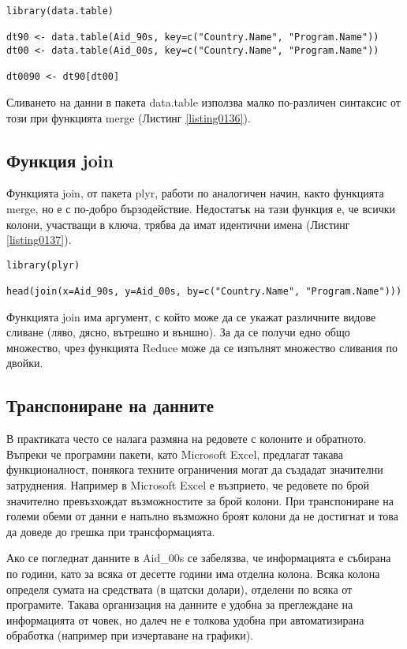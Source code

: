 \begin{lstlisting}[caption=Сливане на данни при data.table, label=listing0136]
library(data.table)

dt90 <- data.table(Aid_90s, key=c("Country.Name", "Program.Name"))
dt00 <- data.table(Aid_00s, key=c("Country.Name", "Program.Name"))

dt0090 <- dt90[dt00]
\end{lstlisting}

Сливането на данни в пакета data.table използва малко по-различен синтаксис от този при функцията merge (Листинг \ref{listing0136}).

\subsection{Функция join}

Функцията join, от пакета plyr, работи по аналогичен начин, както функцията merge, но е с по-добро бързодействие. Недостатък на тази функция е, че всички колони, участващи в ключа, трябва да имат идентични имена (Листинг \ref{listing0137}).

\begin{lstlisting}[caption=Сливане на данни с join, label=listing0137]
library(plyr)

head(join(x=Aid_90s, y=Aid_00s, by=c("Country.Name", "Program.Name")))
\end{lstlisting}

Функцията join има аргумент, с който може да се укажат различните видове сливане (ляво, дясно, вътрешно и външно). За да се получи едно общо множество, чрез функцията Reduce може да се изпълнят множество сливания по двойки.

\subsection{Транспониране на данните}

В практиката често се налага размяна на редовете с колоните и обратното. Въпреки че програмни пакети, като Microsoft Excel, предлагат такава функционалност, понякога техните ограничения могат да създадат значителни затруднения. Например в Microsoft Excel е възприето, че редовете по брой значително превъзхождат възможностите за брой колони. При транспониране на големи обеми от данни е напълно възможно броят колони да не достигнат и това да доведе до грешка при трансформацията.

Ако се погледнат данните в Aid\_00s се забелязва, че информацията е събирана по години, като за всяка от десетте години има отделна колона. Всяка колона определя сумата на средствата (в щатски долари), отделени по всяка от програмите. Такава организация на данните е удобна за преглеждане на информацията от човек, но далеч не е толкова удобна при автоматизирана обработка (например при изчертаване на графики).

